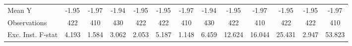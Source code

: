 {\begin{tabular}{l*{12}{c}}
\midrule
Mean Y      &       -1.95         &       -1.97         &       -1.94         &       -1.95         &       -1.95         &       -1.97         &       -1.94         &       -1.95         &       -1.97         &       -1.95         &       -1.95         &       -1.97         \\
Observations&         422         &         410         &         430         &         422         &         422         &         410         &         430         &         422         &         410         &         422         &         422         &         410         \\
Exc. Inst. F-stat&       4.193         &       1.584         &       3.062         &       2.053         &       5.187         &       1.148         &       6.459         &      12.624         &      16.044         &      25.431         &       2.947         &      53.823         \\
\bottomrule
\end{tabular}
}

